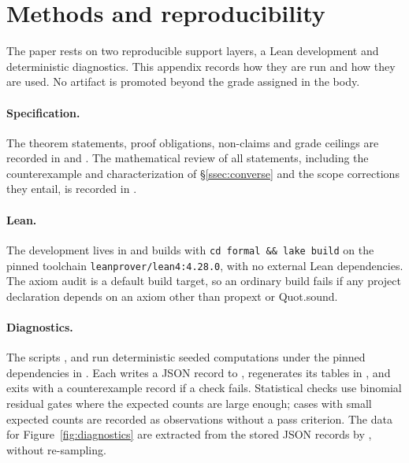 \section{Methods and reproducibility}\label{app:methods}

The paper rests on two reproducible support layers, a Lean development and deterministic
diagnostics. This appendix records how they are run and how they are used. No artifact is promoted
beyond the grade assigned in the body.

\paragraph{Specification.} The theorem statements, proof obligations, non-claims and grade
ceilings are recorded in  and
. The mathematical review of all statements, including the
counterexample and characterization of \S\ref{ssec:converse} and the scope corrections they
entail, is recorded in .

\paragraph{Lean.} The development lives in  and builds with \texttt{cd formal \&\&
lake build} on the pinned toolchain \texttt{leanprover/lean4:4.28.0}, with no external Lean
dependencies. The axiom audit  is a default build target, so an
ordinary build fails if any project declaration depends on an axiom other than
\textsf{propext} or \textsf{Quot.sound}.

\paragraph{Diagnostics.} The scripts ,
 and  run deterministic
seeded computations under the pinned dependencies in . Each
writes a JSON record to , regenerates its tables in
, and exits with a counterexample record if a check fails. Statistical
checks use binomial residual gates where the expected counts are large enough; cases with small
expected counts are recorded as observations without a pass criterion. The data for
Figure~\ref{fig:diagnostics} are extracted from the stored JSON records by
, without re-sampling.

